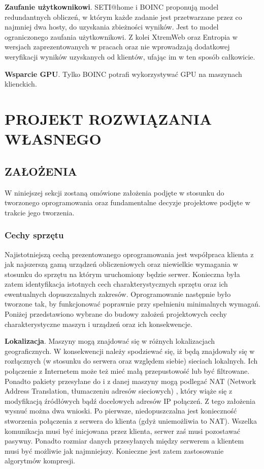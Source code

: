 \documentclass[12pt,a4paper,twoside]{article}
\begin{document}
\textbf{Zaufanie użytkownikowi}. SETI@home i BOINC proponują model redundantnych obliczeń, w którym każde zadanie jest przetwarzane przez co najmniej dwa hosty, do uzyskania zbieżności wyników. Jest to model ograniczonego zaufania użytkownikowi. Z kolei XtremWeb oraz Entropia w wersjach zaprezentowanych w pracach \cite{entropia} oraz \cite{xtremweb} nie wprowadzają dodatkowej weryfikacji wyników uzyskanych od klientów, ufając im w ten sposób całkowicie.

\textbf{Wsparcie GPU}. Tylko BOINC potrafi wykorzystywać GPU na maszynach klienckich.

\section{PROJEKT ROZWIĄZANIA WŁASNEGO}

\subsection{ZAŁOŻENIA}

W niniejszej sekcji zostaną omówione założenia podjęte w stosunku do tworzonego oprogramowania oraz fundamentalne decyzje projektowe podjęte w trakcie jego tworzenia.

\subsubsection{Cechy sprzętu}
\label{sec:hardware}

Najistotniejszą cechą prezentowanego oprogramowania jest współpraca klienta z jak najszerszą gamą urządzeń obliczeniowych oraz niewielkie wymagania w stosunku do sprzętu na którym uruchomiony będzie serwer. Konieczna była zatem identyfikacja istotnych cech charakterystycznych sprzętu oraz ich ewentualnych dopuszczalnych zakresów. Oprogramowanie następnie było tworzone tak, by funkcjonować poprawnie przy spełnieniu minimalnych wymagań. Poniżej przedstawiono wybrane do budowy założeń projektowych cechy charakterystyczne maszyn i urządzeń oraz ich konsekwencje.

\textbf{Lokalizacja}. Maszyny mogą znajdować się w różnych lokalizacjach geograficznych. W konsekwencji należy spodziewać się, iż będą znajdowały się w rozłącznych (w stosunku do serwera oraz względem siebie) sieciach lokalnych. Ich połączenie z Internetem może też mieć małą przepustowość lub być filtrowane. Ponadto pakiety przesyłane do i z danej maszyny mogą podlegać NAT (Network Address Translation, tłumaczeniu adresów sieciowych) \cite{nat}, który wiąże się z modyfikacją źródłówych bądź docelowych adresów IP połączeń. Z tego założenia wysnuć można dwa wnioski. Po pierwsze, niedopuszczalna jest konieczność stworzenia połączenia z serwera do klienta (gdyż uniemożliwia to NAT). Wszelka komunikacja musi być inicjowana przez klienta, serwer zaś musi pozostawać pasywny. Ponadto rozmiar danych przesyłanych między serwerem a klientem musi być możliwie jak najmniejszy. Konieczne jest zatem zastosowanie algorytmów kompresji.
\end{document}
